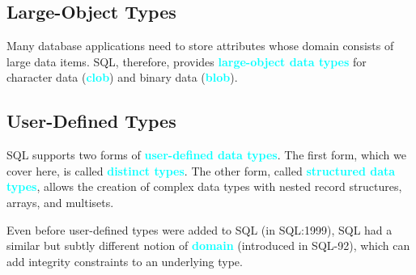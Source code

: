 \documentclass[a4paper,12pt,twoside,openany]{book}
\newcommand{\textcy}[1]{\textbf{\textcolor{cyan}{#1}}}
\begin{document}
\subsection{Large-Object Types}

Many database applications need to store attributes whose domain consists of large data items. SQL, therefore, provides \textcy{large-object data types} for character data (\textcy{clob}) and binary data (\textcy{blob}).

\subsection{User-Defined Types}

SQL supports two forms of \textcy{user-defined data types}. The first form, which we cover here, is called \textcy{distinct types}. The other form, called \textcy{structured data types}, allows the creation of complex data types with nested record structures, arrays, and multisets.

Even before user-defined types were added to SQL (in SQL:1999), SQL had a similar but subtly different notion of \textcy{domain} (introduced in SQL-92), which can add integrity constraints to an underlying type.

\end{document}
